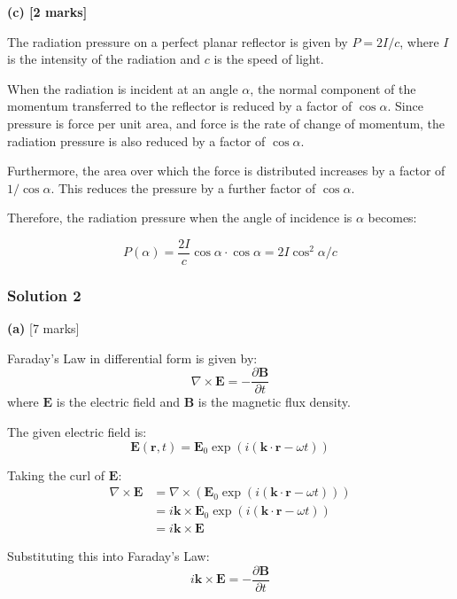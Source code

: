 \documentclass{article}
\begin{document}
\textbf{(c) [2 marks]}

The radiation pressure on a perfect planar reflector is given by $P = 2I/c$, where $I$ is the intensity of the radiation and $c$ is the speed of light.

When the radiation is incident at an angle $\alpha$, the normal component of the momentum transferred to the reflector is reduced by a factor of $\cos \alpha$.  Since pressure is force per unit area, and force is the rate of change of momentum, the radiation pressure is also reduced by a factor of $\cos \alpha$.

Furthermore, the area over which the force is distributed increases by a factor of $1/\cos \alpha$. This reduces the pressure by a further factor of $\cos \alpha$.

Therefore, the radiation pressure when the angle of incidence is $\alpha$ becomes:

\begin{equation*}
P(\alpha) = \frac{2I}{c} \cos \alpha \cdot \cos \alpha = 2I \cos^2 \alpha / c
\end{equation*}


\subsubsection{Solution 2}
\textbf{(a)} [7 marks]

Faraday's Law in differential form is given by:
\begin{equation*}
\nabla \times \mathbf{E} = -\frac{\partial \mathbf{B}}{\partial t}
\end{equation*}
where $\mathbf{E}$ is the electric field and $\mathbf{B}$ is the magnetic flux density.

The given electric field is:
\begin{equation*}
\mathbf{E}(\mathbf{r}, t) = \mathbf{E}_0 \exp(i (\mathbf{k} \cdot \mathbf{r} - \omega t))
\end{equation*}

Taking the curl of $\mathbf{E}$:
\begin{align*}
\nabla \times \mathbf{E} &= \nabla \times (\mathbf{E}_0 \exp(i (\mathbf{k} \cdot \mathbf{r} - \omega t))) \\
&= i \mathbf{k} \times \mathbf{E}_0 \exp(i (\mathbf{k} \cdot \mathbf{r} - \omega t)) \\
&= i \mathbf{k} \times \mathbf{E}
\end{align*}

Substituting this into Faraday's Law:
\begin{equation*}
i \mathbf{k} \times \mathbf{E} = -\frac{\partial \mathbf{B}}{\partial t}
\end{equation*}
\end{document}

